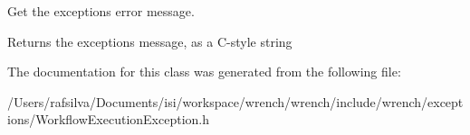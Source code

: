 Get the exception\textquotesingle{}s error message. 

\begin{DoxyReturn}{Returns}
the exception\textquotesingle{}s message, as a C-\/style string 
\end{DoxyReturn}


The documentation for this class was generated from the following file\+:\begin{DoxyCompactItemize}
\item 
/\+Users/rafsilva/\+Documents/isi/workspace/wrench/wrench/include/wrench/exceptions/Workflow\+Execution\+Exception.\+h\end{DoxyCompactItemize}
